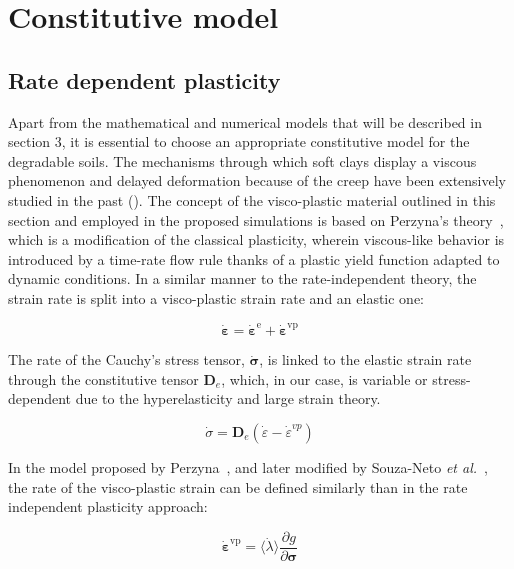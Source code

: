 \documentclass[applsci,journal,article,submit,moreauthors,pdftex]{Definitions/mdpi}
\begin{document}
 
\section{Constitutive model}


\subsection{Rate dependent plasticity}
Apart from the mathematical and numerical models that will be described in section 3, it is essential to choose an appropriate constitutive model for the degradable soils. The mechanisms through which soft clays display a viscous phenomenon and delayed deformation because of the creep have been extensively studied in the past (\cite{Bjerrum1967}).
The concept of the visco-plastic material outlined in this section and employed in the proposed simulations is based on Perzyna’s theory~\cite{Perzyna:66}, which is a modification of the classical plasticity, wherein viscous-like behavior is introduced by a time-rate flow rule thanks of a plastic yield function adapted to dynamic conditions. In a similar manner to the rate-independent theory, the strain rate is split into a visco-plastic strain rate and an elastic one:

\begin{equation}
\dot{\boldsymbol{\varepsilon}}=\dot{\boldsymbol{\varepsilon}}^{\mathrm{e}}+\dot{\boldsymbol{\varepsilon}}^{\mathrm{vp}}
\end{equation}

The rate of the Cauchy's stress tensor, $\boldsymbol{\dot{\sigma}}$, is linked to the elastic strain rate through the constitutive tensor $\boldsymbol{D}_{e}$, which, in our case, is variable or stress-dependent due to the hyperelasticity and large strain theory.

\begin{equation}
\dot{\sigma}=\mathbf{D}_{e}\left(\dot{\varepsilon}-\dot{\varepsilon}^{v p}\right)
\end{equation}

In the model proposed by Perzyna~\cite{Perzyna:66}, and later modified by Souza-Neto \textit{et al.}~\cite{DPOwen2005}, the rate of the visco-plastic strain can be defined similarly than in the rate independent plasticity approach:

\begin{equation}
\dot{\boldsymbol{\varepsilon}}^{\mathrm{vp}}=\langle \dot{\lambda}\rangle \frac{\partial g}{\partial \boldsymbol{\sigma}}
\end{equation}
\end{document}
